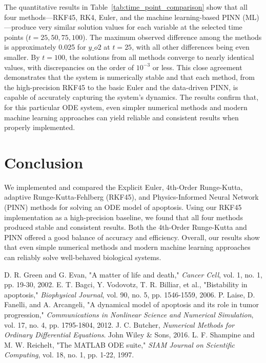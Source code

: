 \documentclass[conference]{IEEEtran}
\begin{document}
The quantitative results in Table~\ref{tab:time_point_comparison} show that all four methods—RKF45, RK4, Euler, and the machine learning-based PINN (ML)—produce very similar solution values for each variable at the selected time points ($t=25, 50, 75, 100$). The maximum observed difference among the methods is approximately 0.025 for $y\_o2$ at $t=25$, with all other differences being even smaller. By $t=100$, the solutions from all methods converge to nearly identical values, with discrepancies on the order of $10^{-3}$ or less. This close agreement demonstrates that the system is numerically stable and that each method, from the high-precision RKF45 to the basic Euler and the data-driven PINN, is capable of accurately capturing the system's dynamics. The results confirm that, for this particular ODE system, even simpler numerical methods and modern machine learning approaches can yield reliable and consistent results when properly implemented.

\section{Conclusion}
We implemented and compared the Explicit Euler, 4th-Order Runge-Kutta, adaptive Runge-Kutta-Fehlberg (RKF45), and Physics-Informed Neural Network (PINN) methods for solving an ODE model of apoptosis. Using our RKF45 implementation as a high-precision baseline, we found that all four methods produced stable and consistent results. Both the 4th-Order Runge-Kutta and PINN offered a good balance of accuracy and efficiency. Overall, our results show that even simple numerical methods and modern machine learning approaches can reliably solve well-behaved biological systems.

\begin{thebibliography}{00}
 D. R. Green and G. Evan, "A matter of life and death," \textit{Cancer Cell}, vol. 1, no. 1, pp. 19-30, 2002.
 E. T.  Bagci, Y. Vodovotz, T. R. Billiar, et al., "Bistability in apoptosis," \textit{Biophysical Journal}, vol. 90, no. 5, pp. 1546-1559, 2006.
 P. Laise, D. Fanelli, and A. Arcangeli, "A dynamical model of apoptosis and its role in tumor progression," \textit{Communications in Nonlinear Science and Numerical Simulation}, vol. 17, no. 4, pp. 1795-1804, 2012.
 J. C. Butcher, \textit{Numerical Methods for Ordinary Differential Equations}. John Wiley \& Sons, 2016.
 L. F. Shampine and M. W. Reichelt, "The MATLAB ODE suite," \textit{SIAM Journal on Scientific Computing}, vol. 18, no. 1, pp. 1-22, 1997.
\end{thebibliography}
\end{document}
